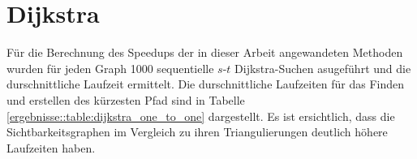 % 

\section{Dijkstra}

Für die Berechnung des Speedups der in dieser Arbeit angewandeten Methoden wurden für jeden Graph \num{1000} sequentielle $s$-$t$ Dijkstra-Suchen asugeführt und die durschnittliche Laufzeit ermittelt.
Die durschnittliche Laufzeiten für das Finden und erstellen des kürzesten Pfad sind in Tabelle \ref{ergebnisse::table:dijkstra_one_to_one} dargestellt.
Es ist ersichtlich, dass die Sichtbarkeitsgraphen im Vergleich zu ihren Triangulierungen deutlich höhere Laufzeiten haben.

